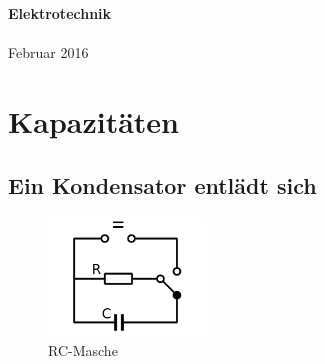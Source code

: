 \documentclass[a4paper,10pt,fleqn,twocolumn,twoside,dvipdfmx]{scrartcl}
\numberwithin{equation}{section}
\begin{document}

\noindent
\textbf{\sffamily\huge Elektrotechnik}\\
\\
{\large Februar 2016}

\tableofcontents

\section{Kapazitäten}
\subsection{Ein Kondensator entlädt sich}

\begin{figure}[h]
\centering
\includegraphics[width=42mm]{img/RC.png}
\caption{RC-Masche}
\label{RC}
\end{figure}
\end{document}
